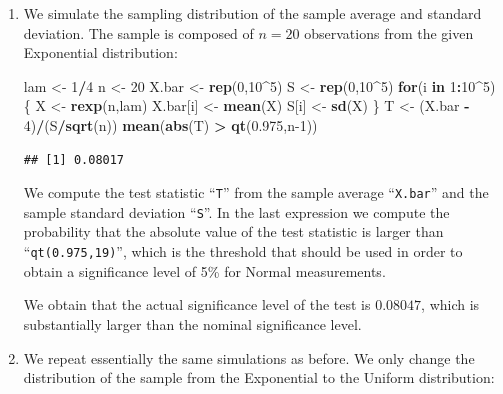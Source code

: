 \documentclass[
]{krantz}
\makeatletter
\newenvironment{Shaded}{\begin{snugshade}}{\end{snugshade}}
\newcommand{\ControlFlowTok}[1]{\textcolor[rgb]{0.13,0.29,0.53}{\textbf{#1}}}
\newcommand{\DecValTok}[1]{\textcolor[rgb]{0.00,0.00,0.81}{#1}}
\newcommand{\FloatTok}[1]{\textcolor[rgb]{0.00,0.00,0.81}{#1}}
\newcommand{\KeywordTok}[1]{\textcolor[rgb]{0.13,0.29,0.53}{\textbf{#1}}}
\newcommand{\NormalTok}[1]{#1}
\newcommand{\OperatorTok}[1]{\textcolor[rgb]{0.81,0.36,0.00}{\textbf{#1}}}
\newcommand{\StringTok}[1]{\textcolor[rgb]{0.31,0.60,0.02}{#1}}
\newenvironment{kframe}{%
\medskip{}
\setlength{\fboxsep}{.8em}
 \def\at@end@of@kframe{}%
 \ifinner\ifhmode%
  \def\at@end@of@kframe{\end{minipage}}%
  \begin{minipage}{\columnwidth}%
 \fi\fi%
 \def\FrameCommand##1{\hskip\@totalleftmargin \hskip-\fboxsep
 \colorbox{shadecolor}{##1}\hskip-\fboxsep
     \hskip-\linewidth \hskip-\@totalleftmargin \hskip\columnwidth}%
 \MakeFramed {\advance\hsize-\width
   \@totalleftmargin\z@ \linewidth\hsize
   \@setminipage}}%
 {\par\unskip\endMakeFramed%
 \at@end@of@kframe}
\renewenvironment{Shaded}{\begin{kframe}}{\end{kframe}}
\theoremstyle{definition}
\theoremstyle{definition}
\theoremstyle{definition}
\theoremstyle{remark}
\makeatother
\begin{document}
\begin{enumerate}
\def\labelenumi{\arabic{enumi}.}
\item
  We simulate the sampling distribution
  of the sample average and standard deviation. The sample is composed of
  \(n=20\) observations from the given Exponential distribution:

\begin{Shaded}
\begin{Highlighting}[]
\NormalTok{lam <-}\StringTok{ }\DecValTok{1}\OperatorTok{/}\DecValTok{4}
\NormalTok{n <-}\StringTok{ }\DecValTok{20}
\NormalTok{X.bar <-}\StringTok{ }\KeywordTok{rep}\NormalTok{(}\DecValTok{0}\NormalTok{,}\DecValTok{10}\OperatorTok{^}\DecValTok{5}\NormalTok{)}
\NormalTok{S <-}\StringTok{ }\KeywordTok{rep}\NormalTok{(}\DecValTok{0}\NormalTok{,}\DecValTok{10}\OperatorTok{^}\DecValTok{5}\NormalTok{)}
\ControlFlowTok{for}\NormalTok{(i }\ControlFlowTok{in} \DecValTok{1}\OperatorTok{:}\DecValTok{10}\OperatorTok{^}\DecValTok{5}\NormalTok{) \{}
\NormalTok{  X <-}\StringTok{ }\KeywordTok{rexp}\NormalTok{(n,lam)}
\NormalTok{  X.bar[i] <-}\StringTok{ }\KeywordTok{mean}\NormalTok{(X)}
\NormalTok{  S[i] <-}\StringTok{ }\KeywordTok{sd}\NormalTok{(X)}
\NormalTok{\}}
\NormalTok{T <-}\StringTok{ }\NormalTok{(X.bar }\OperatorTok{-}\StringTok{ }\DecValTok{4}\NormalTok{)}\OperatorTok{/}\NormalTok{(S}\OperatorTok{/}\KeywordTok{sqrt}\NormalTok{(n))}
\KeywordTok{mean}\NormalTok{(}\KeywordTok{abs}\NormalTok{(T) }\OperatorTok{>}\StringTok{ }\KeywordTok{qt}\NormalTok{(}\FloatTok{0.975}\NormalTok{,n}\DecValTok{-1}\NormalTok{))}
\end{Highlighting}
\end{Shaded}

\begin{verbatim}
## [1] 0.08017
\end{verbatim}

  We compute the test statistic ``\texttt{T}'' from the sample average ``\texttt{X.bar}''
  and the sample standard deviation ``\texttt{S}''. In the last expression we
  compute the probability that the absolute value of the test statistic is
  larger than ``\texttt{qt(0.975,19)}'', which is the threshold that should be used
  in order to obtain a significance level of 5\% for Normal measurements.

  We obtain that the actual significance level of the test is \(0.08047\),
  which is substantially larger than the nominal significance level.
\item
  We repeat essentially the same
  simulations as before. We only change the distribution of the sample
  from the Exponential to the Uniform distribution:


\end{enumerate}
\end{document}
